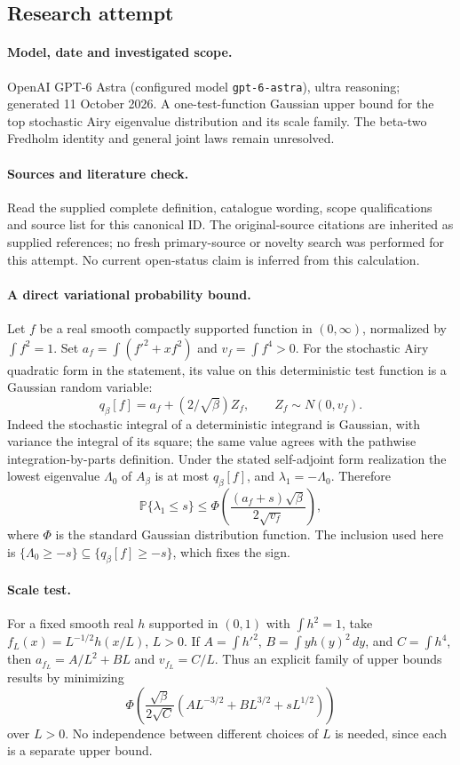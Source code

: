 \documentclass[11pt]{article}
\begin{document}
\subsection{Research attempt}
\paragraph{Model, date and investigated scope.}
OpenAI GPT-6 Astra (configured model \texttt{gpt-6-astra}), ultra reasoning; generated 11 October 2026. A one-test-function Gaussian upper bound for the top stochastic Airy eigenvalue distribution and its scale family. The beta-two Fredholm identity and general joint laws remain unresolved.

\paragraph{Sources and literature check.}
Read the supplied complete definition, catalogue wording, scope qualifications and source list for this canonical ID. The original-source citations are inherited as supplied references; no fresh primary-source or novelty search was performed for this attempt. No current open-status claim is inferred from this calculation.

\paragraph{A direct variational probability bound.}Let \(f\) be a real smooth compactly supported function in \((0,\infty)\), normalized by \(\int f^2=1\). Set \(a_f=\int(f'^2+xf^2)\) and \(v_f=\int f^4>0\). For the stochastic Airy quadratic form in the statement, its value on this deterministic test function is a Gaussian random variable:
\[q_\beta[f]=a_f+(2/\sqrt\beta)Z_f,\qquad Z_f\sim N(0,v_f).\]
Indeed the stochastic integral of a deterministic integrand is Gaussian, with variance the integral of its square; the same value agrees with the pathwise integration-by-parts definition. Under the stated self-adjoint form realization the lowest eigenvalue \(\Lambda_0\) of \(A_\beta\) is at most \(q_\beta[f]\), and \(\lambda_1=-\Lambda_0\). Therefore
\[\mathbb P\{\lambda_1\le s\}\le
\Phi\left(\frac{(a_f+s)\sqrt\beta}{2\sqrt{v_f}}\right),\]
where \(\Phi\) is the standard Gaussian distribution function. The inclusion used here is \(\{\Lambda_0\ge-s\}\subseteq\{q_\beta[f]\ge-s\}\), which fixes the sign.
\paragraph{Scale test.}For a fixed smooth real \(h\) supported in \((0,1)\) with \(\int h^2=1\), take \(f_L(x)=L^{-1/2}h(x/L)\), \(L>0\). If \(A=\int h'^2\), \(B=\int yh(y)^2\,dy\), and \(C=\int h^4\), then \(a_{f_L}=A/L^2+BL\) and \(v_{f_L}=C/L\). Thus an explicit family of upper bounds results by minimizing
\[\Phi\left(\frac{\sqrt\beta}{2\sqrt C}(A L^{-3/2}+B L^{3/2}+sL^{1/2})\right)
\]
over \(L>0\). No independence between different choices of \(L\) is needed, since each is a separate upper bound.
\end{document}

